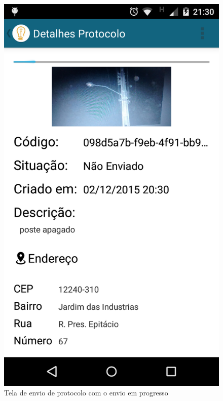\documentclass[
	article,			%
	11pt,				%
	oneside,			%
	a4paper,			%
	english,			%
	brazil,				%
	sumario=tradicional
	]{abntex2}
\begin{document}
\begin{figure}[!htbp]
\begin{minipage}{0.4\textwidth}
  \end{minipage}
  \hfill
  \begin{minipage}{0.4\textwidth}
    \centering
    \caption{\label{android-tela-enviando}Tela de envio de protocolo com o envio em progresso}
    \includegraphics[scale=0.1]{android/6.png}
  \end{minipage}
\end{figure}
\end{document}
